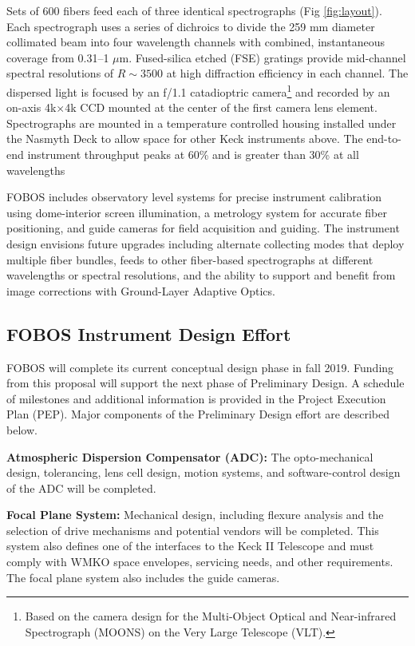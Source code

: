 \documentclass[oneside,11pt]{amsart}
\newcommand{\comment}[2][todo]{{\color{#1}[[{\bf #2}]]}}
\begin{document}
Sets of 600 fibers feed each of three identical spectrographs (Fig
\ref{fig:layout}).  Each spectrograph uses a series of dichroics to
divide the 259 mm diameter collimated beam into four wavelength channels with combined, instantaneous
coverage from 0.31--1 $\mu$m.  Fused-silica etched (FSE) gratings provide mid-channel spectral resolutions of $R
\sim 3500$ at high diffraction efficiency in each channel.  The dispersed light is focused by an f/1.1
catadioptric camera\footnote{Based on the camera design for the Multi-Object Optical and Near-infrared Spectrograph (MOONS) on the Very Large Telescope (VLT).} and recorded by an on-axis 4k$\times$4k CCD mounted
at the center of the first camera lens element.  Spectrographs are
mounted in a temperature controlled housing installed under the Nasmyth
Deck to allow space for other Keck instruments above.  The end-to-end
instrument throughput peaks at 60\% and is greater than 30\% at all wavelengths

FOBOS includes observatory level systems for precise instrument
calibration using dome-interior screen illumination, a metrology system
for accurate fiber positioning, and guide cameras for field acquisition
and guiding.  The instrument design envisions future upgrades including
alternate collecting modes that deploy multiple fiber bundles, feeds to
other fiber-based spectrographs at different wavelengths or spectral
resolutions, and the ability to support and benefit from image
corrections with Ground-Layer Adaptive Optics.

\subsection{FOBOS Instrument Design Effort}
\label{sec:design}

FOBOS will complete its current conceptual design phase in fall 2019. Funding from this proposal will support the next
phase of Preliminary Design.  A schedule of milestones and additional information is provided in the Project
Execution Plan (PEP).  Major components of the Preliminary Design effort are described below.

\noindent \textbf{Atmospheric Dispersion Compensator (ADC):} The
opto-mechanical design, tolerancing, lens cell design, motion systems,
and software-control design of the ADC will be completed.  

\noindent \textbf{Focal Plane System:} Mechanical design, including flexure analysis and
the selection of drive mechanisms and potential vendors will be
completed.  This system also defines one of the interfaces to the Keck
II Telescope and must comply with WMKO space envelopes, servicing needs,
and other requirements.  The focal plane system also includes the
guide cameras.
\end{document}
